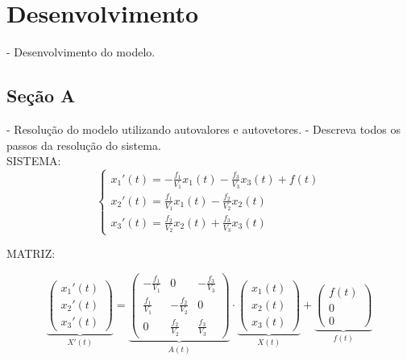\section{Desenvolvimento}

- Desenvolvimento do modelo.

\subsection{Seção A}

- Resolução do modelo utilizando autovalores e autovetores.
- Descreva todos os passos da resolução do sistema.
\\
SISTEMA:
\begin{equation}
    \begin{cases}
      x_1'(t)=-\frac{f_1}{V_1}x_1(t)-\frac{f_3}{V_3}x_3(t)+f(t)\\[5pt]
      x_2'(t)=\frac{f_1}{V_1}x_1(t)-\frac{f_2}{V_2}x_2(t)\\[5pt]
      x_3'(t)=\frac{f_2}{V_2}x_2(t)+\frac{f_3}{V_3}x_3(t)
    \end{cases}
\end{equation}

MATRIZ:
\begin{center}
\begin{equation}
\renewcommand{\arraystretch}{1.8}
\underbrace{\begin{pmatrix}
    x_1'(t)\\
    x_2'(t)\\
    x_3'(t)
\end{pmatrix}}_\text{$X'(t)$}
=
\underbrace{\begin{pmatrix}
-\frac{f_1}{V_1} & 0 & -\frac{f_3}{V_3}\\
\frac{f_1}{V_1} & -\frac{f_2}{V_2} & 0\\
0 & \frac{f_2}{V_2} & \frac{f_3}{V_3}
\end{pmatrix}}_\text{$A(t)$}
\cdot
\underbrace{\begin{pmatrix}
x_1(t)\\
x_2(t)\\
x_3(t)
\end{pmatrix}}_\text{$X(t)$}
+
\underbrace{\begin{pmatrix}
f(t)\\
0\\
0
\end{pmatrix}}_\text{$f(t)$}
\end{equation}
\end{center}

